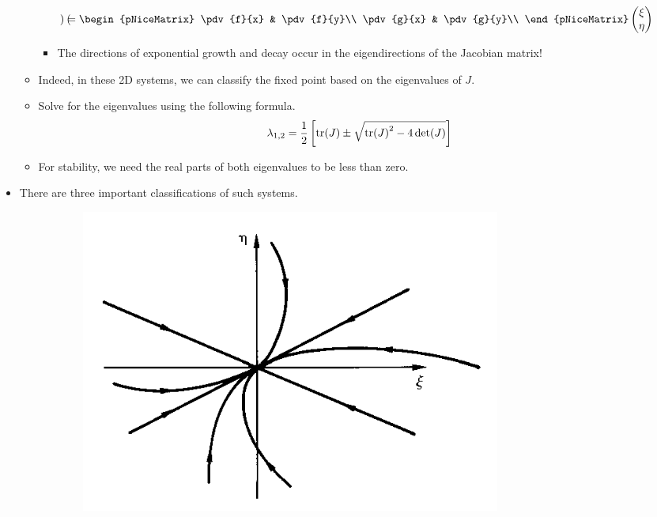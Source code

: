 \documentclass[../notes.tex]{subfiles}
\begin{document}
\begin{itemize}
\begin{itemize}
\begin{equation*}
\begin{pmatrix}
            \end{pmatrix}
            =
            \begin{pNiceMatrix}
                \pdv{f}{x} & \pdv{f}{y}\\
                \pdv{g}{x} & \pdv{g}{y}\\
            \end{pNiceMatrix}
            \begin{pmatrix}
                \xi\\
                \eta\\
            \end{pmatrix}
        \end{equation*}
        \begin{itemize}
            \item The directions of exponential growth and decay occur in the eigendirections of the Jacobian matrix!
        \end{itemize}
        \item Indeed, in these 2D systems, we can classify the fixed point based on the eigenvalues of $J$.
        \item Solve for the eigenvalues using the following formula.
        \begin{equation*}
            \lambda_{1,2} = \frac{1}{2}\left[ \tr(J)\pm\sqrt{\tr(J)^2-4\det(J)} \right]
        \end{equation*}
        \item For stability, we need the real parts of both eigenvalues to be less than zero.
    \end{itemize}
    \item There are three important classifications of such systems.
    \begin{figure}[h!]
        \centering
        \begin{subfigure}[b]{0.24\linewidth}
            \centering
            \includegraphics[width=0.95\linewidth]{../ExtFiles/flows2Da.png}

\end{subfigure}
\end{figure}
\end{itemize}
\end{document}
